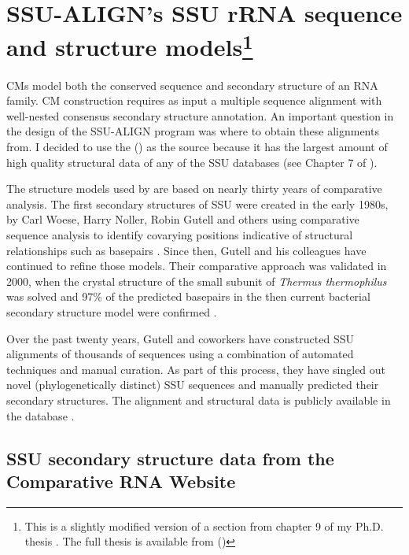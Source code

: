 \section[SSU-ALIGN's SSU rRNA sequence and structure models]{SSU-ALIGN's SSU rRNA sequence and structure
  models\footnote{This is a slightly modified version 
  of a section from chapter 9 of my Ph.D. thesis \cite{Nawrocki09b}.
  The full thesis is available from
  ()}}
\label{sec:models}

CMs model both the conserved sequence and secondary structure of an
RNA family. CM construction requires as input a multiple sequence
alignment with well-nested consensus secondary structure
annotation. An important question in the design of the SSU-ALIGN
program was where to obtain these alignments from. I decided to use
the  () \cite{CannoneGutell02} as
the source because it has the largest amount of high quality
structural data of any of the SSU databases (see
Chapter 7 of \cite{Nawrocki09b}).

The structure models used by  are based on nearly thirty years of
comparative analysis. The first secondary structures of SSU were
created in the early 1980s, by Carl Woese, Harry Noller, Robin Gutell
and others using comparative sequence analysis to identify covarying
positions indicative of structural relationships such as basepairs
\cite{Woese80,Noller81,Woese83}. Since then, Gutell and his
colleagues have continued to refine those models. Their comparative
approach was validated in 2000, when the crystal structure of the
small subunit of \emph{Thermus thermophilus} was solved
\cite{Wimberly00} and 97\% of the predicted basepairs in the then
current bacterial secondary structure model were confirmed
\cite{CannoneGutell02}.

Over the past twenty years, Gutell and coworkers have constructed SSU
alignments of thousands of sequences using a combination of automated
techniques and manual curation. As part of this process, they have
singled out novel (phylogenetically distinct) SSU sequences and
manually predicted their secondary structures. The alignment and
structural data is publicly available in the  database
\cite{CannoneGutell02}. 

\subsection{SSU secondary structure data from the Comparative RNA
  Website} 

